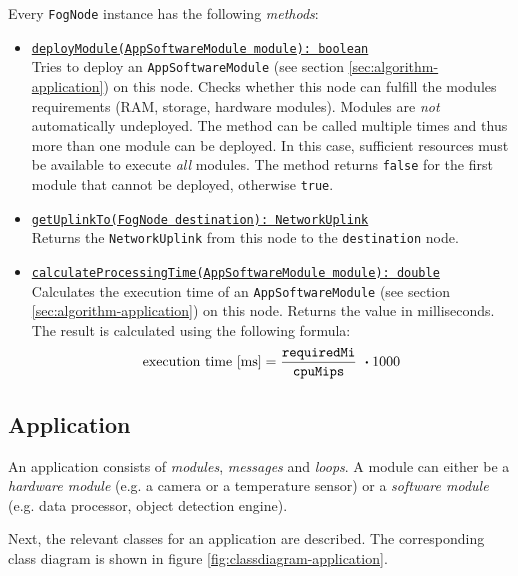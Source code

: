 \begin{itemize}
    Every \texttt{FogNode} instance has the following \textit{methods}:
    \begin{itemize}
        \item \underline{\texttt{deployModule(AppSoftwareModule module): boolean}}\\ [0.5ex] 
        Tries to deploy an \texttt{AppSoftwareModule} (see section \ref{sec:algorithm-application}) on this node. Checks whether this node can fulfill the modules requirements (RAM, storage, hardware modules). Modules are \textit{not} automatically undeployed. The method can be called multiple times and thus more than one module can be deployed. In this case, sufficient resources must be available to execute \textit{all} modules. The method returns \texttt{false} for the first module that cannot be deployed, otherwise \texttt{true}.
        
        \item \underline{\texttt{getUplinkTo(FogNode destination): NetworkUplink}}\\ [0.5ex] 
        Returns the \texttt{NetworkUplink} from this node to the \texttt{destination} node.
        
        \item \underline{\texttt{calculateProcessingTime(AppSoftwareModule module): double}}\\ [0.5ex] 
        Calculates the execution time of an \texttt{AppSoftwareModule} (see section \ref{sec:algorithm-application}) on this node. Returns the value in milliseconds. The result is calculated using the following formula:
        \[\textrm{execution time [ms]} = \frac{\textrm{\texttt{requiredMi}}}{\textrm{\texttt{cpuMips}}}\ \boldsymbol{\cdot} 1000\]
    \end{itemize}

\end{itemize}


\subsection{Application\label{sec:algorithm-application}}

An application consists of \textit{modules}, \textit{messages} and \textit{loops}. A module can either be a \textit{hardware module} (e.g. a camera or a temperature sensor) or a \textit{software module} (e.g. data processor, object detection engine).

Next, the relevant classes for an application are described. The corresponding class diagram is shown in figure \ref{fig:classdiagram-application}.

